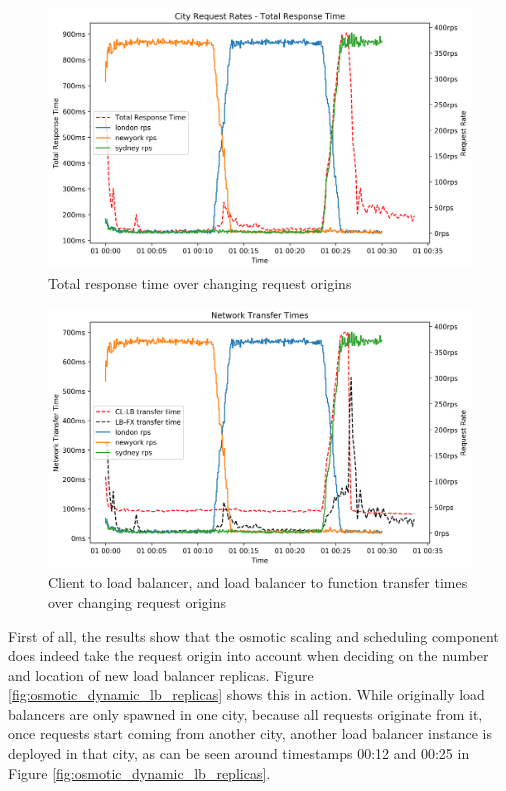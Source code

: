 \begin{figure}
    \centering
    \includegraphics[width=14cm]{graphics/graphs/osmotic_dynamc_region_rps_trt.png}
    \caption{Total response time over changing request origins}
    \label{fig:osmotic_dynamic_trt}
\end{figure}

\begin{figure}
    \centering
    \includegraphics[width=14cm]{graphics/graphs/osmotic_dynamic_region_tx_times.png}
    \caption{Client to load balancer, and load balancer to function transfer times over changing request origins}
    \label{fig:osmotic_dynamic_tx}
\end{figure}

First of all, the results show that the osmotic scaling and scheduling component does indeed take the request origin into account when deciding on the number and location of new load balancer replicas.
Figure \ref{fig:osmotic_dynamic_lb_replicas} shows this in action.
While originally load balancers are only spawned in one city, because all requests originate from it, once requests start coming from another city, another load balancer instance is deployed in that city, as can be seen around timestamps 00:12 and 00:25 in Figure \ref{fig:osmotic_dynamic_lb_replicas}.

